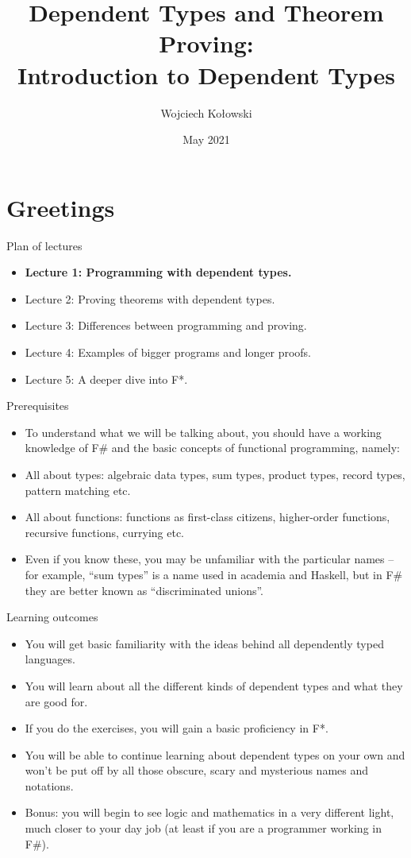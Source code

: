 \documentclass{beamer}
\title{Dependent Types and Theorem Proving: \\Introduction to Dependent Types}
\author{Wojciech Kołowski}
\date{May 2021}
\begin{document}
\frame{\titlepage}

\section{Greetings}

\begin{frame}{Plan of lectures}
\begin{itemize}
	\item \textbf{Lecture 1: Programming with dependent types.}
	\item Lecture 2: Proving theorems with dependent types.
	\item Lecture 3: Differences between programming and proving.
	\item Lecture 4: Examples of bigger programs and longer proofs.
	\item Lecture 5: A deeper dive into F*.
\end{itemize}
\end{frame}

\begin{frame}{Prerequisites}
\begin{itemize}
	\item To understand what we will be talking about, you should have a working knowledge of F\# and the basic concepts of functional programming, namely:
	\item All about types: algebraic data types, sum types, product types, record types, pattern matching etc.
	\item All about functions: functions as first-class citizens, higher-order functions, recursive functions, currying etc.
	\item Even if you know these, you may be unfamiliar with the particular names -- for example, ``sum types'' is a name used in academia and Haskell, but in F\# they are better known as ``discriminated unions''.
\end{itemize}
\end{frame}

\begin{frame}{Learning outcomes}
\begin{itemize}
	\item You will get basic familiarity with the ideas behind all dependently typed languages.
	\item You will learn about all the different kinds of dependent types and what they are good for.
	\item If you do the exercises, you will gain a basic proficiency in F*.
	\item You will be able to continue learning about dependent types on your own and won't be put off by all those obscure, scary and mysterious names and notations.
	\item Bonus: you will begin to see logic and mathematics in a very different light, much closer to your day job (at least if you are a programmer working in F\#).
\end{itemize}
\end{frame}
\end{document}
